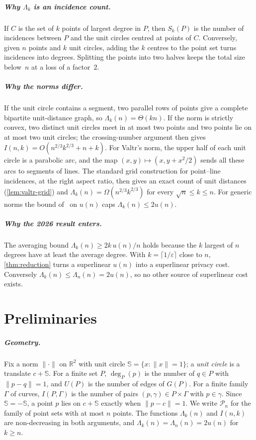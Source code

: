 \documentclass[anonymous,a4paper,USenglish,cleveref,autoref,thm-restate]{socg-lipics-v2021}
\newcommand{\R}{\mathbb{R}}
\newcommand{\eps}{\varepsilon}
\newcommand{\cP}{\mathcal{P}}
\newcommand{\Lam}{\Lambda}
\newcommand{\nrm}[1]{\lVert #1\rVert}
\begin{document}
\subparagraph*{Why $\Lam_k$ is an incidence count.}
If $C$ is the set of $k$ points of largest degree in $P$, then $S_k(P)$ is the number of incidences between $P$ and the unit circles centred at points of $C$. Conversely, given $n$ points and $k$ unit circles, adding the $k$ centres to the point set turns incidences into degrees. Splitting the points into two halves keeps the total size below~$n$ at a loss of a factor~$2$.

\subparagraph*{Why the norms differ.}
If the unit circle contains a segment, two parallel rows of points give a complete bipartite unit-distance graph, so $\Lam_k(n)=\Theta(kn)$. If the norm is strictly convex, two distinct unit circles meet in at most two points and two points lie on at most two unit circles; the crossing-number argument then gives $I(n,k)=O(n^{2/3}k^{2/3}+n+k)$. For Valtr's norm, the upper half of each unit circle is a parabolic arc, and the map $(x,y)\mapsto(x,y+x^2/2)$ sends all these arcs to segments of lines. The standard grid construction for point--line incidences, at the right aspect ratio, then gives an exact count of unit distances (\cref{lem:valtr-grid}) and $\Lam_k(n)=\Omega(n^{2/3}k^{2/3})$ for every $\sqrt n\le k\le n$. For generic norms the bound of~\cite{ABS23} on $u(n)$ caps $\Lam_k(n)\le 2u(n)$.

\subparagraph*{Why the 2026 result enters.}
The averaging bound $\Lam_k(n)\ge 2k\,u(n)/n$ holds because the $k$ largest of $n$ degrees have at least the average degree. With $k=\lceil 1/\eps\rceil$ close to $n$, \cref{thm:reduction} turns a superlinear $u(n)$ into a superlinear privacy cost. Conversely $\Lam_k(n)\le\Lam_n(n)=2u(n)$, so no other source of superlinear cost exists.

\section{Preliminaries}
\label{sec:prelim}

\subparagraph*{Geometry.}
Fix a norm $\nrm{\cdot}$ on $\R^2$ with unit circle $\mathbb S=\{x:\nrm{x}=1\}$; a \emph{unit circle} is a translate $c+\mathbb S$. For a finite set $P$, $\deg_P(p)$ is the number of $q\in P$ with $\nrm{p-q}=1$, and $U(P)$ is the number of edges of $G(P)$. For a finite family $\Gamma$ of curves, $I(P,\Gamma)$ is the number of pairs $(p,\gamma)\in P\times\Gamma$ with $p\in\gamma$. Since $\mathbb S=-\mathbb S$, a point $p$ lies on $c+\mathbb S$ exactly when $\nrm{p-c}=1$. We write $\cP_n$ for the family of point sets with at most $n$ points. The functions $\Lam_k(n)$ and $I(n,k)$ are non-decreasing in both arguments, and $\Lam_k(n)=\Lam_n(n)=2u(n)$ for $k\ge n$.
\end{document}

